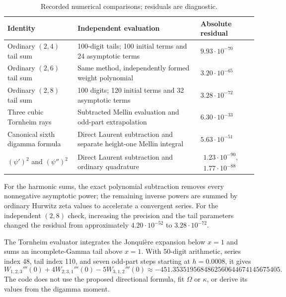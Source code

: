 \begin{table}[htbp]
\centering\small
\caption{Recorded numerical comparisons; residuals are diagnostic.}
\label{tab:numerics}
\begin{tabular}{@{}p{}p{}>{\raggedleft\arraybackslash}p{}@{}}
\toprule
Identity & Independent evaluation & Absolute residual\\
\midrule
Ordinary $(2,4)$ tail sum & 100-digit tails; 100 initial terms and 24 asymptotic terms
 & $9.93\cdot10^{-70}$\\[5pt]
Ordinary $(2,6)$ tail sum & Same method, independently formed weight polynomial
 & $3.20\cdot10^{-65}$\\[5pt]
Ordinary $(2,8)$ tail sum & 100 digits; 120 initial terms and 32 asymptotic terms
 & $3.28\cdot10^{-72}$\\[5pt]
Three cubic Tornheim rays & Subtracted Mellin evaluation and odd-part extrapolation
 & $6.30\cdot10^{-33}$\\[5pt]
Canonical sixth digamma formula & Direct Laurent subtraction and separate height-one Mellin integral
 & $5.63\cdot10^{-51}$\\[5pt]
$(\psi')^2$ and $(\psi'')^2$ & Direct Laurent subtraction and ordinary quadrature
 & $\begin{gathered}1.23\cdot10^{-90},\\1.77\cdot10^{-88}\end{gathered}$\\
\bottomrule
\end{tabular}
\end{table}

For the harmonic sums, the exact polynomial subtraction removes every
nonnegative asymptotic power; the remaining inverse powers are summed
by ordinary Hurwitz zeta values to accelerate a convergent series.
For the independent $(2,8)$ check, increasing the precision and the
tail parameters changed the residual from approximately
$4.20\cdot10^{-52}$ to $3.28\cdot10^{-72}$.

The Tornheim evaluator integrates the Jonqui\`ere expansion below $x=1$
and sums an incomplete-Gamma tail above $x=1$. With 50-digit arithmetic,
series index 48, tail index 110, and seven odd-part steps starting at
$h=0.0008$, it gives
\[
 W_{1,2,3}'''(0)+4W_{2,3,1}'''(0)-5W_{3,1,2}'''(0)
 \approx-451.3535195684862560644674145675405.
\]
The code does not use the proposed directional formula, fit $\Omega$
or $\kappa$, or derive its values from the digamma moment.

